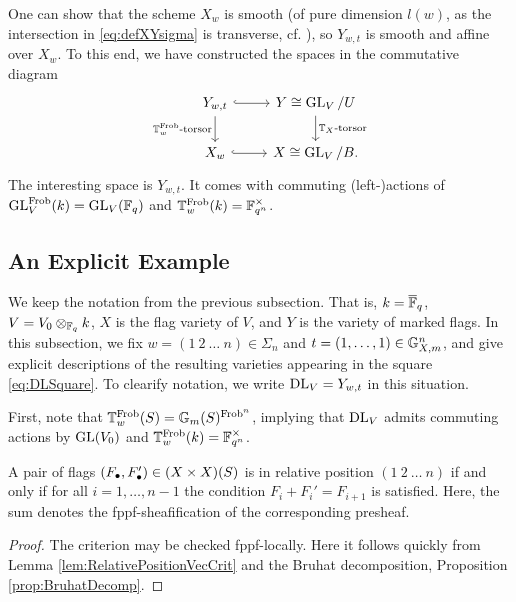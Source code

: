 \documentclass[../main.tex]{subfiles}
\begin{document}
One can show that the scheme $X_w$ is smooth (of pure dimension $l(w)$, 
as the intersection in \eqref{eq:defXYsigma} is transverse, cf.
\cite{delignelusztig1976}), so $Y_{w, t}$ is smooth and affine over $X_w$. 
To this end, we have constructed the spaces in the commutative diagram
\begin{equation} \label{eq:DLSquare}
\begin{tikzcd}[ampersand replacement=\&]
	{Y_{w,t}} \& {Y \cong \GL_V/U} \\
	{X_w} \& {X \cong \GL_V/B.}
	\arrow[hook, from=1-1, to=1-2]
	\arrow["{\TT_w^{\Frob}\text{-torsor}}"', from=1-1, to=2-1]
	\arrow["{\TT_X\text{-torsor}}", from=1-2, to=2-2]
	\arrow[hook, from=2-1, to=2-2]
\end{tikzcd}
\end{equation}
The interesting space is $Y_{w,t}$. It comes with commuting (left-)actions of 
$\operatorname{GL}_V^{\mathrm{Frob}}(k) = \operatorname{GL}_V(\mathbb{F}_q)$ and $\mathbb{T}_w^{\mathrm{Frob}}(k) = \mathbb{F}_{q^n}^\times$. 

\subsection{An Explicit Example} %
\label{sub:An Explicit Example}
We keep the notation from the previous subsection. That is, $k = \overline {\mathbb{F}}_q$, 
$V = V_0 \otimes_{\mathbb{F}_q} k$, $X$ is the flag variety of $V$, and $Y$ is the 
variety of marked flags. In this subsection, we fix
$w = (1 \ 2 \ \dots \ n) \in \Sigma_n$ and $t = (1, \dots, 1) \in \mathbb{G}_{X,m}^n$,
and give explicit descriptions of the resulting varieties appearing in the
square \eqref{eq:DLSquare}. To clearify notation, we write $\mathrm{DL}_V = Y_{w, t}$ in this
situation.

First, note that $\mathbb{T}_w^{\mathrm{Frob}}(S) = \mathbb{G}_m(S)^{\mathrm{Frob}^n}$, implying that
$\mathrm{DL}_V$ admits commuting actions 
by $\operatorname{GL}(V_0)$ and $\mathbb{T}_w^{\mathrm{Frob}}(k) = \mathbb{F}_{q^n}^\times$.

\begin{lem}\label{lem:FlagsInRelPosWareez}
  A pair of flags $(F_\bullet, F_\bullet') \in (X \times X)(S)$ is in relative position
  $(1 \ 2 \ \dots \ n)$ 
  if and only if for all $i = 1, \dots, n-1$ the condition $F_i + F_i' =
  F_{i+1}$ is satisfied. Here, the sum denotes the fppf-sheafification of the
  corresponding presheaf. 
\begin{proof}
  The criterion may be checked fppf-locally.
  Here it follows quickly from Lemma \ref{lem:RelativePositionVecCrit} and 
  the Bruhat decomposition, Proposition \ref{prop:BruhatDecomp}.
  \end{proof}
\end{lem}
\end{document}
